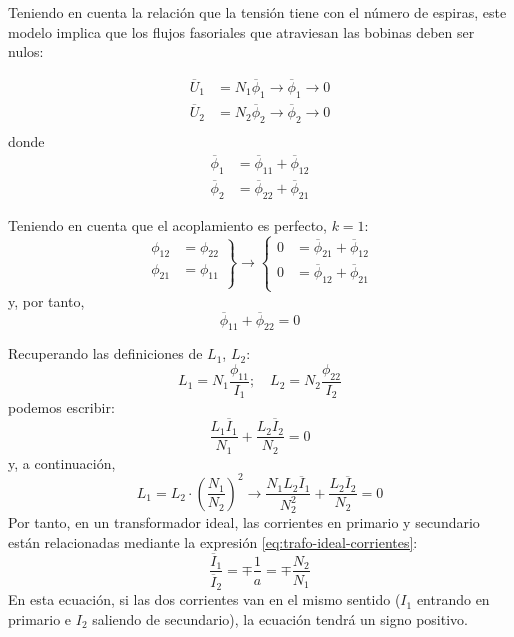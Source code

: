   Teniendo en cuenta la relación que la tensión tiene con el número de espiras, este modelo implica que los flujos fasoriales que atraviesan las bobinas deben ser nulos:

  \begin{align*}
  \overline{U}_1 &= N_1 \overline{\phi}_1 \rightarrow \overline{\phi}_1 \to 0\\
  \overline{U}_2 &= N_2 \overline{\phi}_2 \rightarrow \overline{\phi}_2 \to 0\\
\end{align*}
donde
\begin{align*}
  \overline{\phi}_1 &= \overline{\phi}_{11} + \overline{\phi}_{12}\\
  \overline{\phi}_2 &= \overline{\phi}_{22} + \overline{\phi}_{21}
\end{align*}

Teniendo en cuenta que el acoplamiento es perfecto, $k = 1$:
  \[
    \left.
      \begin{array}{ll}
      \phi_{12} &= \phi_{22}\\
      \phi_{21} &= \phi_{11}\\
    \end{array} \right\} 
       \rightarrow
       \left\{
    \begin{array}{ll}
      0 &= \overline{\phi}_{21} + \overline{\phi}_{12}\\
      0 &= \overline{\phi}_{12} + \overline{\phi}_{21}\\
    \end{array}\right.
\]
y, por tanto,
\[
  \overline{\phi}_{11} + \overline{\phi}_{22} = 0
\]

Recuperando las definiciones de $L_1$, $L_2$:
  \[
    L_1 = N_1 \frac{\phi_{11}}{I_1}; \quad L_2 = N_2
    \frac{\phi_{22}}{I_2}
  \]
podemos escribir:
\[
  \frac{L_1 \overline{I}_1}{N_1} + \frac{L_2 \overline{I}_2}{N_2}
  = 0
\]
y, a continuación,
\[
    L_1 = L_2 \cdot \left(\frac{N_1}{N_2}\right)^2 \rightarrow
    \frac{N_1L_2 \overline{I}_1}{N^2_2} + \frac{L_2
      \overline{I}_2}{N_2} = 0
  \]
Por tanto, en un transformador ideal, las corrientes en primario y secundario están relacionadas mediante la expresión \ref{eq:trafo-ideal-corrientes}:
\begin{equation}
  \label{eq:trafo-ideal-corrientes}
  \boxed{\frac{\overline{I}_1}{\overline{I}_2} = \mp \frac{1}{a} =
    \mp \frac{N_2}{N_1}}
\end{equation}
En esta ecuación, si las dos corrientes van en el mismo sentido ($I_1$ entrando en primario e $I_2$ saliendo de secundario), la ecuación tendrá un signo positivo.

